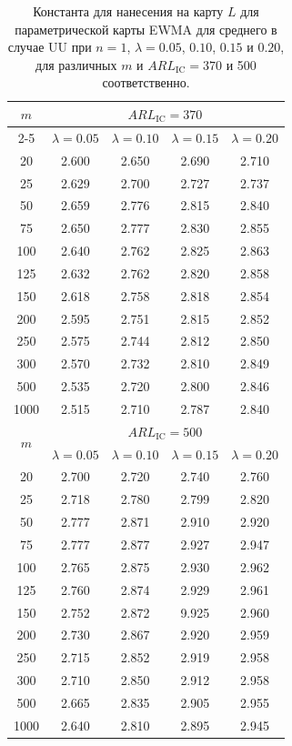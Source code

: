 \begin{table}[htbp]
	\centering
	\caption{Константа для нанесения на карту \(L\) для параметрической карты EWMA для среднего в случае UU при \(n = 1\), \(\lambda = 0.05\), \(0.10\), \(0.15\) и \(0.20\), для различных \(m\) и \(ARL_{\text{IC}} = 370\) и 500 соответственно.}
	\label{tab:3.21}
	\begin{tabular}{ccccc}
		\toprule
		\multirow{2}{*}{\(m\)} & \multicolumn{4}{c}{\(ARL_{\text{IC}} = 370\)} \\
		\cmidrule(lr){2-5}
		& \(\lambda = 0.05\) & \(\lambda = 0.10\) & \(\lambda = 0.15\) & \(\lambda = 0.20\) \\
		\midrule
		20   & 2.600 & 2.650 & 2.690 & 2.710 \\
		25   & 2.629 & 2.700 & 2.727 & 2.737 \\
		50   & 2.659 & 2.776 & 2.815 & 2.840 \\
		75   & 2.650 & 2.777 & 2.830 & 2.855 \\
		100  & 2.640 & 2.762 & 2.825 & 2.863 \\
		125  & 2.632 & 2.762 & 2.820 & 2.858 \\
		150  & 2.618 & 2.758 & 2.818 & 2.854 \\
		200  & 2.595 & 2.751 & 2.815 & 2.852 \\
		250  & 2.575 & 2.744 & 2.812 & 2.850 \\
		300  & 2.570 & 2.732 & 2.810 & 2.849 \\
		500  & 2.535 & 2.720 & 2.800 & 2.846 \\
		1000 & 2.515 & 2.710 & 2.787 & 2.840 \\
		\midrule
		\multirow{2}{*}{\(m\)} & \multicolumn{4}{c}{\(ARL_{\text{IC}} = 500\)} \\
		\cmidrule(lr){2-5}
		& \(\lambda = 0.05\) & \(\lambda = 0.10\) & \(\lambda = 0.15\) & \(\lambda = 0.20\) \\
		\midrule
		20   & 2.700 & 2.720 & 2.740 & 2.760 \\
		25   & 2.718 & 2.780 & 2.799 & 2.820 \\
		50   & 2.777 & 2.871 & 2.910 & 2.920 \\
		75   & 2.777 & 2.877 & 2.927 & 2.947 \\
		100  & 2.765 & 2.875 & 2.930 & 2.962 \\
		125  & 2.760 & 2.874 & 2.929 & 2.961 \\
		150  & 2.752 & 2.872 & 9.925 & 2.960 \\ %
		200  & 2.730 & 2.867 & 2.920 & 2.959 \\
		250  & 2.715 & 2.852 & 2.919 & 2.958 \\
		300  & 2.710 & 2.850 & 2.912 & 2.958 \\
		500  & 2.665 & 2.835 & 2.905 & 2.955 \\
		1000 & 2.640 & 2.810 & 2.895 & 2.945 \\
		\bottomrule
	\end{tabular}
\end{table}


